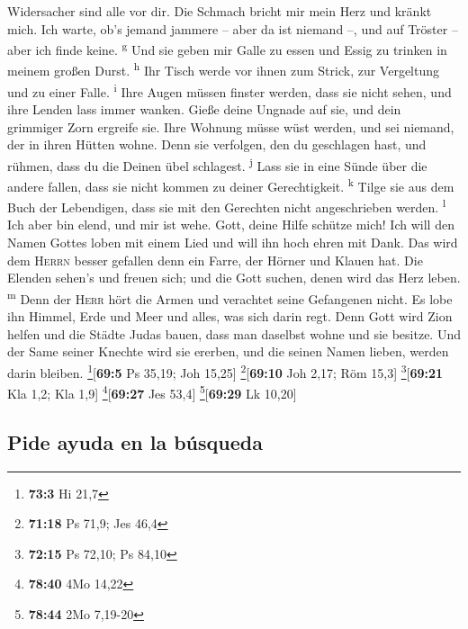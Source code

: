 Widersacher sind alle vor dir.  Die Schmach bricht mir
mein Herz und kränkt mich. Ich warte, ob's jemand jammere -- aber da ist
niemand --, und auf Tröster -- aber ich finde keine. \textsuperscript{g}
 Und sie geben mir Galle zu essen und Essig zu trinken in
meinem großen Durst. \textsuperscript{h}  Ihr Tisch werde
vor ihnen zum Strick, zur Vergeltung und zu einer Falle.
\textsuperscript{i}  Ihre Augen müssen finster werden,
dass sie nicht sehen, und ihre Lenden lass immer wanken. 
Gieße deine Ungnade auf sie, und dein grimmiger Zorn ergreife sie.
 Ihre Wohnung müsse wüst werden, und sei niemand, der in
ihren Hütten wohne.  Denn sie verfolgen, den du
geschlagen hast, und rühmen, dass du die Deinen übel schlagest.
\textsuperscript{j}  Lass sie in eine Sünde über die
andere fallen, dass sie nicht kommen zu deiner Gerechtigkeit.
\textsuperscript{k}  Tilge sie aus dem Buch der
Lebendigen, dass sie mit den Gerechten nicht angeschrieben werden.
\textsuperscript{l}  Ich aber bin elend, und mir ist
wehe. Gott, deine Hilfe schütze mich!  Ich will den Namen
Gottes loben mit einem Lied und will ihn hoch ehren mit Dank.
 Das wird dem \textsc{Herrn} besser gefallen denn ein
Farre, der Hörner und Klauen hat.  Die Elenden sehen's
und freuen sich; und die Gott suchen, denen wird das Herz leben.
\textsuperscript{m}  Denn der \textsc{Herr} hört die
Armen und verachtet seine Gefangenen nicht.  Es lobe ihn
Himmel, Erde und Meer und alles, was sich darin regt. 
Denn Gott wird Zion helfen und die Städte Judas bauen, dass man daselbst
wohne und sie besitze.  Und der Same seiner Knechte wird
sie ererben, und die seinen Namen lieben, werden darin bleiben.
\footnote{\textbf{73:3} Hi 21,7}{[}\textbf{69:5} Ps 35,19; Joh 15,25{]}
\footnote{\textbf{71:18} Ps 71,9; Jes 46,4}{[}\textbf{69:10} Joh 2,17;
Röm 15,3{]} \footnote{\textbf{72:15} Ps 72,10; Ps 84,10}{[}\textbf{69:21}
Kla 1,2; Kla 1,9{]} \footnote{\textbf{78:40} 4Mo 14,22}{[}\textbf{69:27}
Jes 53,4{]} \footnote{\textbf{78:44} 2Mo 7,19-20}{[}\textbf{69:29} Lk
10,20{]}

\hypertarget{pide-ayuda-en-la-buxfasqueda}{%
\subsection{Pide ayuda en la
búsqueda}\label{pide-ayuda-en-la-buxfasqueda}}

